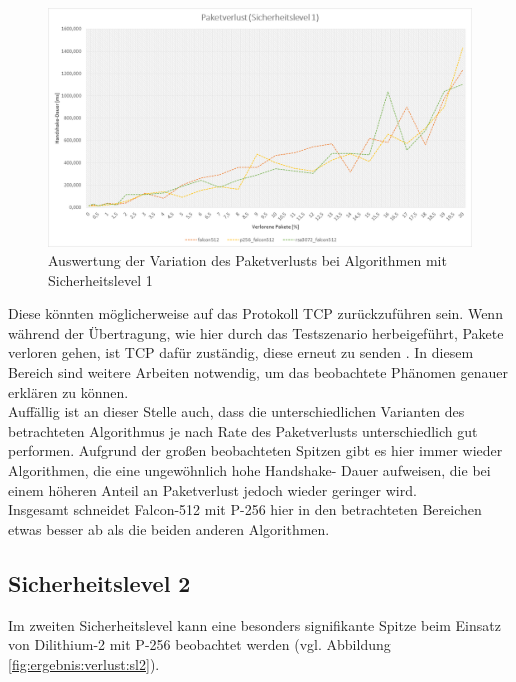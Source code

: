 		\begin{figure}[htbp]
			\centering
			\includegraphics[width=\textwidth]{../auswertung/verlust_sl1.png}
			\caption{Auswertung der Variation des Paketverlusts bei Algorithmen mit Sicherheitslevel 1}
			\label{fig:ergebnis:verlust:sl1}
		\end{figure}
		
		Diese könnten möglicherweise auf das Protokoll TCP zurückzuführen sein. Wenn während der Übertragung, wie hier durch das Testszenario herbeigeführt, 		Pakete verloren gehen, ist TCP dafür zuständig, diese erneut zu senden \cite{Henrich2022}. In diesem Bereich sind weitere Arbeiten notwendig, um das 		beobachtete Phänomen genauer erklären zu können.\\
		
		Auffällig ist an dieser Stelle auch, dass die unterschiedlichen Varianten des betrachteten Algorithmus je nach Rate des Paketverlusts 							unterschiedlich gut performen. Aufgrund der großen beobachteten Spitzen gibt es hier immer wieder Algorithmen, die eine ungewöhnlich hohe Handshake-			Dauer aufweisen, die bei einem höheren Anteil an Paketverlust jedoch wieder geringer wird.\\
		
		Insgesamt schneidet Falcon-512 mit P-256 hier in den betrachteten Bereichen etwas besser ab als die beiden anderen Algorithmen.
		
		\subsection{Sicherheitslevel 2}
		\label{subsec:ergebnis:verlust:sl2}
		
		Im zweiten Sicherheitslevel kann eine besonders signifikante Spitze beim Einsatz von Dilithium-2 mit P-256 beobachtet werden (vgl. Abbildung 					\ref{fig:ergebnis:verlust:sl2}).
		
